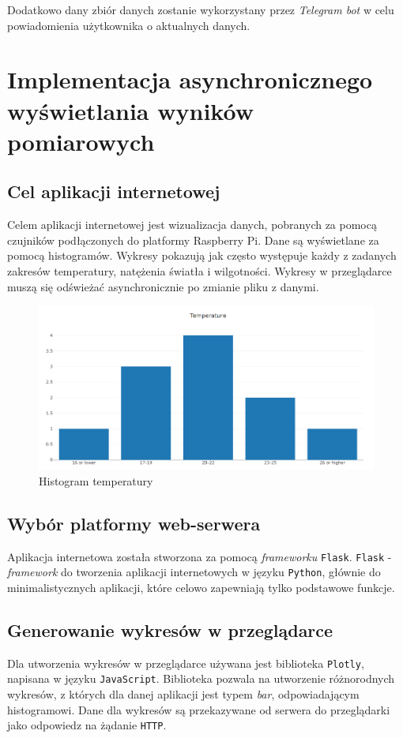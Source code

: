 \documentclass[a4paper]{article}
\begin{document}
	Dodatkowo dany zbiór danych zostanie wykorzystany przez \textit{Telegram bot}
	w celu powiadomienia użytkownika o aktualnych danych.

\section{Implementacja asynchronicznego wyświetlania wyników pomiarowych}

    \subsection{Cel aplikacji internetowej}
        Celem aplikacji internetowej jest wizualizacja danych, pobranych za pomocą czujników podłączonych do platformy Raspberry Pi.
	Dane są wyświetlane za pomocą histogramów. Wykresy pokazują jak często występuje każdy z zadanych zakresów temperatury, natężenia światła i wilgotności. 
	Wykresy w przeglądarce muszą się odświeżać asynchronicznie po zmianie pliku z danymi.
        \begin{figure}[H]
            \centering
            \includegraphics[scale=0.3]{exampleChart.png}
            \caption{Histogram temperatury}
        \end{figure}
        
        \subsection{Wybór platformy web-serwera}
	Aplikacja internetowa została stworzona za pomocą \textsl{frameworku} \texttt{Flask}. 
	\texttt{Flask} - \textsl{framework} do tworzenia aplikacji internetowych w języku \texttt{Python}, głównie do
	minimalistycznych aplikacji, które celowo zapewniają tylko podstawowe funkcje.
	
    \subsection{Generowanie wykresów w przeglądarce}
	Dla utworzenia wykresów w przeglądarce używana jest biblioteka \texttt{Plotly}, napisana w języku \texttt{JavaScript}.
	Biblioteka pozwala na utworzenie różnorodnych wykresów, z których dla danej aplikacji jest typem \textsl{bar}, odpowiadającym histogramowi. 
	Dane dla wykresów są przekazywane od serwera do przeglądarki jako odpowiedz na żądanie \texttt{HTTP}.
\end{document}
